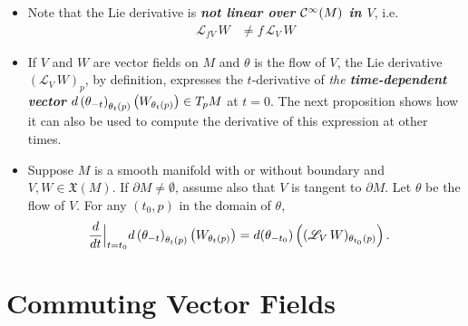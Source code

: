 \documentclass[11pt]{article}
\begin{document}
\begin{itemize}
\item \begin{remark}
Note that the Lie derivative is \emph{\textbf{not linear over ${\mathcal C}^{\infty}(M)$ in $V$}}, i.e.
\begin{align*}
\mathscr{L}_{fV}\,W &\neq f\,\mathscr{L}_{V}\,W
\end{align*}
\end{remark}

\item \begin{remark}
If $V$ and $W$ are vector fields on $M$ and $\theta$ is the flow of $V$, the Lie derivative $(\mathscr{L}_{V}\,W)_{p}$, by definition, expresses the $t$-derivative of \emph{the \textbf{time-dependent vector}} $d\left(\theta_{-t}\right)_{\theta_{t}(p)}\left(W_{\theta_t(p)}\right)  \in T_{p}M$ at $t = 0$. The next proposition shows how it can also
be used to compute the derivative of this expression at other times. 
\end{remark}

\item \begin{proposition}
Suppose $M$ is a smooth manifold with or without boundary and $V, W \in \mathfrak{X}(M)$. If $\partial M \neq \emptyset$, assume also that $V$ is tangent to $\partial M$. Let $\theta$ be the flow of $V$. For any $(t_0, p)$ in the domain of $\theta$,
\begin{align}
 \frac{d}{dt}\Bigr|_{t=t_0} d\left(\theta_{-t}\right)_{\theta_{t}(p)}\left(W_{\theta_t(p)}\right)&= d(\theta_{-t_0})\left((\mathscr{L}_{V}\,W)_{\theta_{t_0}(p)}\right).  \label{eqn: lie_derivative_at_other_time}
\end{align}
\end{proposition}

\end{itemize}



\section{Commuting Vector Fields}
\end{document}
